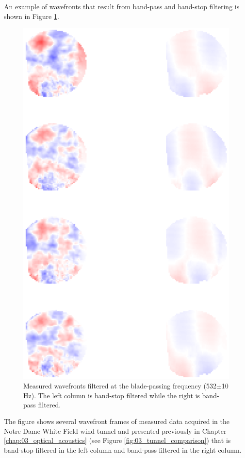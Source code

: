 An example of wavefronts that result from band-pass and band-stop filtering is shown in Figure \ref{fig:06_filter_temporal_bandpass}.
\begin{figure}
 \centering
 \includegraphics{../matlab/06_single_sensor_filtering/filter_temporal_bandpass.eps}
 \caption{Measured wavefronts filtered at the blade-passing frequency (532$\pm$10 Hz).  The left column is band-stop filtered while the right is band-pass filtered.}
 \label{fig:06_filter_temporal_bandpass}
\end{figure}
The figure shows several wavefront frames of measured data acquired in the Notre Dame White Field wind tunnel and presented previously in Chapter \ref{chap:03_optical_acoustics} (see Figure \ref{fig:03_tunnel_comparison}) that is band-stop filtered in the left column and band-pass filtered in the right column.
